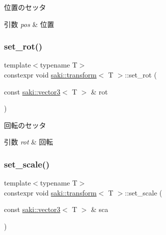 位置のセッタ 


\begin{DoxyParams}{引数}
{\em pos} & 位置 \\
\hline
\end{DoxyParams}
\mbox{\label{classsaki_1_1transform_a0920b584e25129a5b0d42dbc296abd55}} 
\subsubsection{\texorpdfstring{set\+\_\+rot()}{set\_rot()}}
{\footnotesize\ttfamily template$<$typename T$>$ \\
constexpr void \mbox{\hyperlink{classsaki_1_1transform}{saki\+::transform}}$<$ T $>$\+::set\+\_\+rot (\begin{DoxyParamCaption}\item[{const \mbox{\hyperlink{classsaki_1_1vector3}{saki\+::vector3}}$<$ T $>$ \&}]{rot }\end{DoxyParamCaption})\hspace{0.3cm}{\ttfamily [inline]}}



回転のセッタ 


\begin{DoxyParams}{引数}
{\em rot} & 回転 \\
\hline
\end{DoxyParams}
\mbox{\label{classsaki_1_1transform_ad1423bce28426ae4b739ccb22bc0fd5d}} 
\subsubsection{\texorpdfstring{set\+\_\+scale()}{set\_scale()}}
{\footnotesize\ttfamily template$<$typename T$>$ \\
constexpr void \mbox{\hyperlink{classsaki_1_1transform}{saki\+::transform}}$<$ T $>$\+::set\+\_\+scale (\begin{DoxyParamCaption}\item[{const \mbox{\hyperlink{classsaki_1_1vector3}{saki\+::vector3}}$<$ T $>$ \&}]{sca }\end{DoxyParamCaption})\hspace{0.3cm}{\ttfamily [inline]}}



